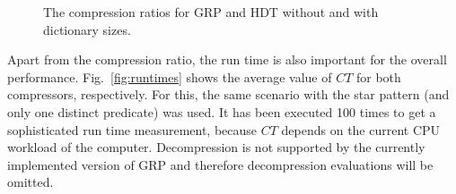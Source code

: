 \begin{figure}[h]
	\centering
	\hfill 
	\caption{The compression ratios for GRP and HDT without and with dictionary sizes.}
	\label{fig:grpvshdt1}
\end{figure}

Apart from the compression ratio, the run time is also important for the overall performance. Fig.~\ref{fig:runtimes} shows the average value of $CT$ for both compressors, respectively. For this, the same scenario with the star pattern (and only one distinct predicate) was used. It has been executed 100 times to get a sophisticated run time measurement, because $CT$ depends on the current CPU workload of the computer. Decompression is not supported by the currently implemented version of GRP and therefore decompression evaluations will be omitted.

